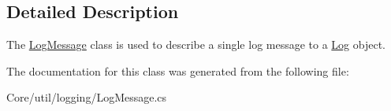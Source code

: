 \subsection{Detailed Description}
The \hyperlink{class_m_b_c_1_1_core_1_1util_1_1_log_message}{Log\-Message} class is used to describe a single log message to a \hyperlink{class_m_b_c_1_1_core_1_1util_1_1_log}{Log} object.

The documentation for this class was generated from the following file\-:\begin{DoxyCompactItemize}
\item 
Core/util/logging/Log\-Message.\-cs\end{DoxyCompactItemize}

